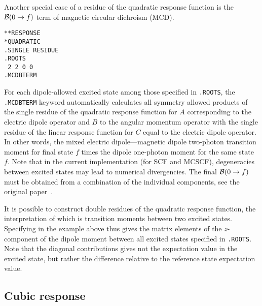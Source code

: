Another special case of a residue of the quadratic response function
is the ${\cal{B}}(0\to f)$ term of magnetic circular dichroism (MCD).
\begin{verbatim}
**RESPONSE
*QUADRATIC
.SINGLE RESIDUE
.ROOTS
 2 2 0 0
.MCDBTERM
\end{verbatim}
For each dipole-allowed excited state among those specified in
{\tt .ROOTS}, the {\tt .MCDBTERM} keyword automatically
calculates all symmetry allowed products of the single residue of the
quadratic response function for $A$ corresponding to the electric dipole
operator and $B$ to the angular momentum operator with the single residue
of the linear response function for $C$ equal to the electric dipole operator.
In other words, the mixed electric dipole---magnetic dipole two-photon
transition moment
for final state $f$ times the dipole one-photon moment for the same state $f$.
Note that in the current implementation (for SCF and MCSCF), degeneracies between
excited states may lead to numerical divergencies.
The final ${\cal{B}}(0\to f)$ must be obtained from a combination
of the individual components, see the original paper~\cite{Coriani:MCDRSP}.

It is possible to construct double
residues of the quadratic
response function, the interpretation of which is transition
moments
between two
excited states. Specifying  in the example above thus gives
the matrix elements of the $z$-component of the dipole moment between
all excited states specified in {\tt .ROOTS}. Note that the diagonal contributions
gives  not the expectation value in the excited state, but rather the
difference relative to the reference state expectation value.

\subsection{Cubic response}
\label{subsec:cubrsp}

\begin{center}
\end{center}

